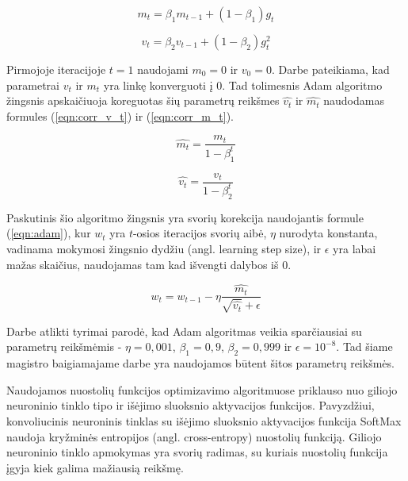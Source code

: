 \begin{equation}
\label{eqn:m_t}
	m_t = \beta_1 m_{t-1} + (1 - \beta_1)g_t
\end{equation}

\begin{equation}
\label{eqn:v_t}
	v_t = \beta_2 v_{t-1} + (1 - \beta_2)g_t^2
\end{equation}

Pirmojoje iteracijoje $t = 1$ naudojami $m_0 = 0$ ir $v_0 = 0$. Darbe \cite{adam} pateikiama, kad parametrai $v_t$ ir $m_t$ yra linkę konverguoti į 0. Tad tolimesnis Adam algoritmo žingsnis apskaičiuoja koreguotas šių parametrų reikšmes $\hat{v_t}$ ir $\hat{m_t}$ naudodamas formules (\ref{eqn:corr_v_t}) ir (\ref{eqn:corr_m_t}).

\begin{equation}
\label{eqn:corr_m_t}
	\hat{m_t} = \dfrac{m_t}{1 - \beta_1^t}
\end{equation}

\begin{equation}
\label{eqn:corr_v_t}
	\hat{v_t} = \dfrac{v_t}{1 - \beta_2^t}
\end{equation}

Paskutinis šio algoritmo žingsnis yra svorių korekcija naudojantis formule (\ref{eqn:adam}), kur $w_t$ yra $t$-osios iteracijos svorių aibė, $\eta$ nurodyta konstanta, vadinama mokymosi žingsnio dydžiu (angl. learning step size), ir $\epsilon$ yra labai mažas skaičius, naudojamas tam kad išvengti dalybos iš 0.

\begin{equation}
\label{eqn:adam}
	w_t = w_{t-1} - \eta \dfrac{\hat{m_t}}{\sqrt{\hat{v_t}} + \epsilon}
\end{equation}

Darbe \cite{adam} atlikti tyrimai parodė, kad Adam algoritmas veikia sparčiausiai su parametrų reikšmėmis - $\eta = 0,001$, $\beta_1 = 0,9$, $\beta_2 = 0,999$ ir $\epsilon = 10^{-8}$. Tad šiame magistro baigiamajame darbe yra naudojamos būtent šitos parametrų reikšmės.

Naudojamos nuostolių funkcijos optimizavimo algoritmuose priklauso nuo giliojo neuroninio tinklo tipo ir išėjimo sluoksnio aktyvacijos funkcijos. Pavyzdžiui, konvoliucinis neuroninis tinklas su išėjimo sluoksnio aktyvacijos funkcija SoftMax naudoja kryžminės entropijos (angl. cross-entropy) nuostolių funkciją. Giliojo neuroninio tinklo apmokymas yra svorių radimas, su kuriais nuostolių funkcija įgyja kiek galima mažiausią reikšmę.
